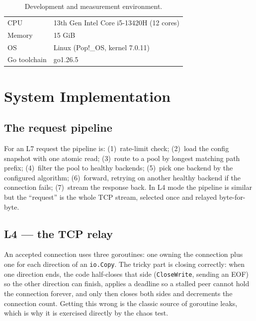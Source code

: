 \documentclass[11pt,a4paper]{report}
\newcommand{\code}[1]{\texttt{#1}}
\begin{document}
\begin{table}[htbp]
\centering
\caption{Development and measurement environment.}
\label{tab:env}
\begin{tabular}{ll}
\toprule
CPU & 13th Gen Intel Core i5-13420H (12 cores)\\
Memory & 15 GiB\\
OS & Linux (Pop!\_OS, kernel 7.0.11)\\
Go toolchain & go1.26.5\\
\bottomrule
\end{tabular}
\end{table}

\section{System Implementation}

\subsection{The request pipeline}
For an L7 request the pipeline is: (1)~rate-limit check; (2)~load the config snapshot with one
atomic read; (3)~route to a pool by longest matching path prefix; (4)~filter the pool to healthy
backends; (5)~pick one backend by the configured algorithm; (6)~forward, retrying on another
healthy backend if the connection fails; (7)~stream the response back. In L4 mode the pipeline is
similar but the ``request'' is the whole TCP stream, selected once and relayed byte-for-byte.

\subsection{L4 --- the TCP relay}
An accepted connection uses three goroutines: one owning the connection plus one for each
direction of an \code{io.Copy}. The tricky part is closing correctly: when one direction ends,
the code half-closes that side (\code{CloseWrite}, sending an EOF) so the other direction can
finish, applies a deadline so a stalled peer cannot hold the connection forever, and only then
closes both sides and decrements the connection count. Getting this wrong is the classic source
of goroutine leaks, which is why it is exercised directly by the chaos test.
\end{document}
